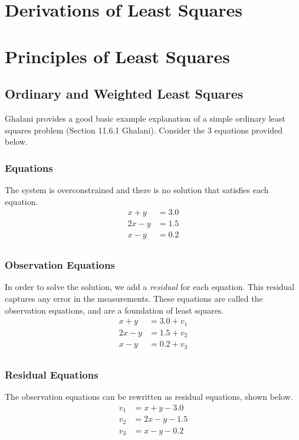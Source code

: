 \section{Derivations of Least Squares}
\section{Principles of Least Squares}
\subsection{Ordinary and Weighted Least Squares}
Ghalani provides a good basic example explanation of a simple ordinary least squares problem (Section 11.6.1 Ghalani). Consider the 3 equations provided below.  

\subsubsection*{Equations}
The system is overconstrained and there is no solution that satisfies each equation.
\begin{align*}
x+y &= 3.0 \\
2x-y &= 1.5 \\
x-y &= 0.2 \\
\end{align*}

\subsubsection*{Observation Equations}
In order to solve the solution, we add a \textit{residual} for each equation.  This residual captures any error in the measurements.  These equations are called the observation equations, and are a foundation of least squares.
\begin{align*}
x+y &= 3.0 + v_1\\
2x-y &= 1.5 + v_2\\
x-y &= 0.2 + v_3\\
\end{align*}

\subsubsection*{Residual Equations}
The observation equations can be rewritten as residual equations, shown below.	
\begin{align*}
v_1 &= x + y - 3.0 \\
v_2 &= 2x - y - 1.5 \\
v_3 &= x - y - 0.2 \\
\end{align*}

